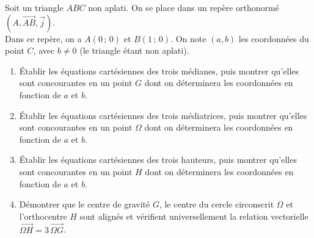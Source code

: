 \documentclass[11pt,a4paper]{article}
\newcommand{\vect}[1]{\overrightarrow{#1}}
\begin{document}
\begin{enoncebox}
Soit un triangle $ABC$ non aplati. On se place dans un repère orthonormé $(A, \vect{AB}, \vec{j})$.\\
Dans ce repère, on a $A(0\,;\,0)$ et $B(1\,;\,0)$. On note $(a, b)$ les coordonnées du point $C$, avec $b \neq 0$ (le triangle étant non aplati).
\begin{enumerate}
    \item Établir les équations cartésiennes des trois médianes, puis montrer qu'elles sont concourantes en un point $G$ dont on déterminera les coordonnées en fonction de $a$ et $b$.
    \item Établir les équations cartésiennes des trois médiatrices, puis montrer qu'elles sont concourantes en un point $\Omega$ dont on déterminera les coordonnées en fonction de $a$ et $b$.
    \item Établir les équations cartésiennes des trois hauteurs, puis montrer qu'elles sont concourantes en un point $H$ dont on déterminera les coordonnées en fonction de $a$ et $b$.
    \item Démontrer que le centre de gravité $G$, le centre du cercle circonscrit $\Omega$ et l'orthocentre $H$ sont alignés et vérifient universellement la relation vectorielle $\vect{\Omega H} = 3\,\vect{\Omega G}$.
\end{enumerate}
\end{enoncebox}
\end{document}

